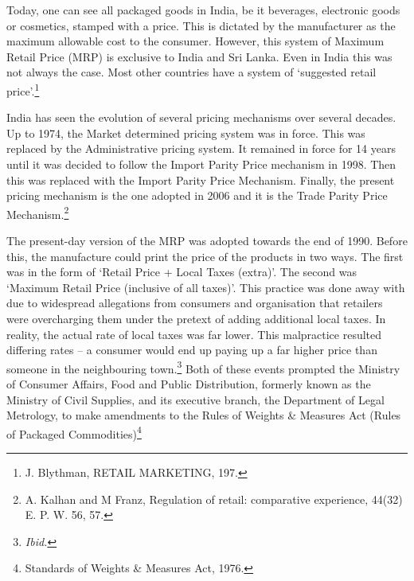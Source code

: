 \begin{multicols}{2}

\vspace{-.15cm}

\noi
Today, one can see all packaged goods in India, be it beverages, electronic goods or cosmetics,
stamped with a price. This is dictated by the manufacturer as the maximum allowable cost to
the consumer. However, this system of Maximum Retail Price (MRP) is exclusive to India and
Sri Lanka. Even in India this was not always the case. Most other countries have a system of
‘suggested retail price’.\footnote{J. Blythman, RETAIL MARKETING, 197.}

\vspace{-.15cm}

\noi
India has seen the evolution of several pricing mechanisms over several decades. Up to 1974,
the Market determined pricing system was in force. This was replaced by the Administrative
pricing system. It remained in force for 14 years until it was decided to follow the Import Parity
Price mechanism in 1998. Then this was replaced with the Import Parity Price Mechanism.
Finally, the present pricing mechanism is the one adopted in 2006 and it is the Trade Parity
Price Mechanism.\footnote{A. Kalhan and M Franz, Regulation of retail: comparative experience, 44(32) E. P. W. 56, 57.}

\vspace{-.15cm}

\noi
The present-day version of the MRP was adopted towards the end of 1990. Before this, the
manufacture could print the price of the products in two ways. The first was in the form of
‘Retail Price + Local Taxes (extra)’. The second was ‘Maximum Retail Price (inclusive of all
taxes)’. This practice was done away with due to widespread allegations from consumers and
organisation that retailers were overcharging them under the pretext of adding additional local
taxes. In reality, the actual rate of local taxes was far lower. This malpractice resulted differing
rates – a consumer would end up paying up a far higher price than someone in the neighbouring
town.\footnote{\textit{Ibid.}} Both of these events prompted the Ministry of Consumer Affairs, Food and Public
Distribution, formerly known as the Ministry of Civil Supplies, and its executive branch, the
Department of Legal Metrology, to make amendments to the Rules of Weights \& Measures
Act (Rules of Packaged Commodities)\footnote{Standards of Weights \& Measures Act, 1976.}

\vspace{-.15cm}


\end{multicols}
